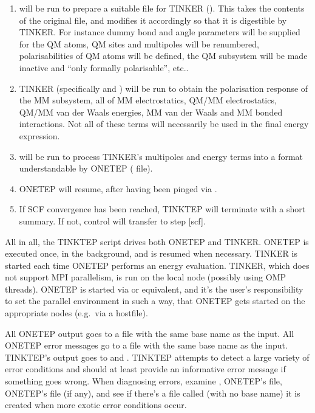 \documentclass[letterpaper,10pt,english]{sphinxmanual}
\begin{document}
\begin{enumerate}
\item {} 
 will be run to prepare a suitable  file for
TINKER (). This takes the contents of the original
 file, and modifies it accordingly so that it is digestible
by TINKER. For instance dummy bond and angle parameters will be
supplied for the QM atoms, QM sites and multipoles will be
renumbered, polarisabilities of QM atoms will be defined, the QM
subsystem will be made inactive and “only formally polarisable”,
etc..

\item {} 
TINKER (specifically  and ) will be run to
obtain the polarisation response of the MM subsystem, all of MM
electrostatics, QM/MM electrostatics, QM/MM van der Waals energies,
MM van der Waals and MM bonded interactions. Not all of these terms
will necessarily be used in the final energy expression.

\item {} 
 will be run to process TINKER’s multipoles and
energy terms into a format understandable by ONETEP
( file).

\item {} 
ONETEP will resume, after having been pinged via .

\item {} 
If SCF convergence has been reached, TINKTEP will terminate with a
short summary. If not, control will transfer to step {[}scf{]}.

\end{enumerate}

All in all, the TINKTEP script drives both ONETEP and TINKER. ONETEP is
executed once, in the background, and is resumed when necessary. TINKER
is started each time ONETEP performs an energy evaluation. TINKER, which
does not support MPI parallelism, is run on the local node (possibly
using OMP threads). ONETEP is started via  or equivalent, and
it’s the user’s responsibility to set the parallel environment in such a
way, that ONETEP gets started on the appropriate nodes (e.g. via a
hostfile).

All ONETEP output goes to a  file with the same base name
as the input. All ONETEP error messages go to a  file with
the same base name as the input. TINKTEP’s output goes to 
and . TINKTEP attempts to detect a large variety of error
conditions and should at least provide an informative error message if
something goes wrong. When diagnosing errors, examine ,
ONETEP’s  file, ONETEP’s  file
(if any), and see if there’s a file called  (with no
base name) \textendash{} it is created when more exotic error conditions occur.
\end{document}
